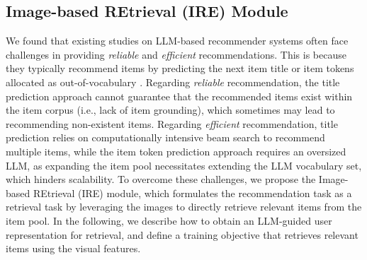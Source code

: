 \documentclass[sigconf]{acmart}
\begin{document}
\subsection{Image-based REtrieval (IRE) Module}
\label{sec:retrieval}
We found that existing studies on LLM-based recommender systems often face challenges in providing \textit{reliable} and \textit{efficient} recommendations. This is because they typically recommend items by predicting the next item title \cite{kim2024large,lin2024bridging,tan2024idgenrec} or item tokens allocated as out-of-vocabulary \cite{wei2024towards,li2023text,zhu2024collaborative}. Regarding \textit{reliable} recommendation, the title prediction approach cannot guarantee that the recommended items exist within the item corpus (i.e., lack of item grounding), which sometimes may lead to recommending non-existent items.
Regarding \textit{efficient} recommendation, title prediction relies on computationally intensive beam search to recommend multiple items, while the item token prediction approach requires an oversized LLM, as expanding the item pool necessitates extending the LLM vocabulary set, which hinders scalability. To overcome these challenges, we propose the Image-based REtrieval (IRE) module, which formulates the recommendation task as a retrieval task by leveraging the images to directly retrieve relevant items from the item pool.
In the following, we describe how to obtain an LLM-guided user representation for retrieval, and define a training objective that retrieves relevant items using the visual features.
\end{document}
